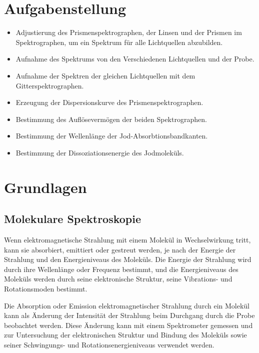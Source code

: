 \documentclass[12pt,english,ngerman]{scrartcl}
\begin{document}

\tableofcontents

\section{Aufgabenstellung\label{sec:Aufgabenstellung}}

\begin{itemize}
	\item Adjustierung des Prismenspektrographen, der Linsen und der Prismen im
	      Spektrographen, um ein Spektrum für alle Lichtquellen abzubilden.
	\item Aufnahme des Spektrums von den Verschiedenen Lichtquellen und der Probe.
	\item Aufnahme der Spektren der gleichen Lichtquellen mit dem Gitterspektrographen.
	\item Erzeugung der Dispersionskurve des Prismenspektrographen.
	\item Bestimmung des Auflösevermögen der beiden Spektrographen.
	\item Bestimmung der Wellenlänge der Jod-Absorbtionsbandkanten.
	\item Bestimmung der Dissoziationsenergie des Jodmoleküls.
\end{itemize}

\section{Grundlagen}\label{sec:Grund}

\subsection{Molekulare Spektroskopie}

Wenn elektromagnetische Strahlung mit einem Molekül in Wechselwirkung tritt,
kann sie absorbiert, emittiert oder gestreut werden, je nach der Energie der
Strahlung und den Energieniveaus des Moleküls. Die Energie der Strahlung wird
durch ihre Wellenlänge oder Frequenz bestimmt, und die Energieniveaus des
Moleküls werden durch seine elektronische Struktur, seine Vibrations- und
Rotationsmoden bestimmt.

Die Absorption oder Emission elektromagnetischer Strahlung durch ein Molekül
kann als Änderung der Intensität der Strahlung beim Durchgang durch die Probe
beobachtet werden. Diese Änderung kann mit einem Spektrometer gemessen und zur
Untersuchung der elektronischen Struktur und Bindung des Moleküls sowie seiner
Schwingungs- und Rotationsenergieniveaus verwendet werden.
\end{document}
